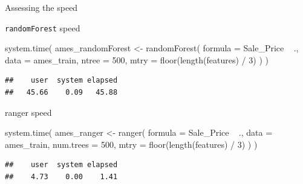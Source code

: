 \documentclass[
  10pt,
  ignorenonframetext,
]{beamer}
\newenvironment{Shaded}{}{}
\newcommand{\DataTypeTok}[1]{#1}
\newcommand{\DecValTok}[1]{#1}
\newcommand{\KeywordTok}[1]{\textcolor[rgb]{0.00,0.00,1.00}{#1}}
\newcommand{\NormalTok}[1]{#1}
\newcommand{\OperatorTok}[1]{#1}
\newcommand{\StringTok}[1]{\textcolor[rgb]{0.00,0.50,0.50}{#1}}
\begin{document}
\begin{frame}[fragile]{Assessing the speed}
\protect\hypertarget{assessing-the-speed}{}

\begin{block}{\texttt{randomForest} speed}

\begin{Shaded}
\begin{Highlighting}[]
\KeywordTok{system.time}\NormalTok{(}
\NormalTok{  ames_randomForest <-}\StringTok{ }\KeywordTok{randomForest}\NormalTok{(}
    \DataTypeTok{formula =}\NormalTok{ Sale_Price }\OperatorTok{~}\StringTok{ }\NormalTok{., }
    \DataTypeTok{data    =}\NormalTok{ ames_train, }
    \DataTypeTok{ntree   =} \DecValTok{500}\NormalTok{,}
    \DataTypeTok{mtry    =} \KeywordTok{floor}\NormalTok{(}\KeywordTok{length}\NormalTok{(features) }\OperatorTok{/}\StringTok{ }\DecValTok{3}\NormalTok{)}
\NormalTok{  )}
\NormalTok{)}
\end{Highlighting}
\end{Shaded}

\begin{verbatim}
##    user  system elapsed 
##   45.66    0.09   45.88
\end{verbatim}

\end{block}

\begin{block}{ranger speed}

\begin{Shaded}
\begin{Highlighting}[]
\KeywordTok{system.time}\NormalTok{(}
\NormalTok{  ames_ranger <-}\StringTok{ }\KeywordTok{ranger}\NormalTok{(}
    \DataTypeTok{formula   =}\NormalTok{ Sale_Price }\OperatorTok{~}\StringTok{ }\NormalTok{., }
    \DataTypeTok{data      =}\NormalTok{ ames_train, }
    \DataTypeTok{num.trees =} \DecValTok{500}\NormalTok{,}
    \DataTypeTok{mtry      =} \KeywordTok{floor}\NormalTok{(}\KeywordTok{length}\NormalTok{(features) }\OperatorTok{/}\StringTok{ }\DecValTok{3}\NormalTok{)}
\NormalTok{  )}
\NormalTok{)}
\end{Highlighting}
\end{Shaded}

\begin{verbatim}
##    user  system elapsed 
##    4.73    0.00    1.41
\end{verbatim}

\end{block}

\end{frame}
\end{document}
